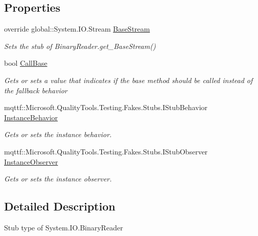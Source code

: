\subsection*{Properties}
\begin{DoxyCompactItemize}
\item 
override global\-::\-System.\-I\-O.\-Stream \hyperlink{class_system_1_1_i_o_1_1_fakes_1_1_stub_binary_reader_ab6f06d4c91093f83e053d80e821827ac}{Base\-Stream}
\begin{DoxyCompactList}\small\item\em Sets the stub of Binary\-Reader.\-get\-\_\-\-Base\-Stream()\end{DoxyCompactList}\item 
bool \hyperlink{class_system_1_1_i_o_1_1_fakes_1_1_stub_binary_reader_afd30a2af1eaea5ff8e2f0ec676f4f809}{Call\-Base}
\begin{DoxyCompactList}\small\item\em Gets or sets a value that indicates if the base method should be called instead of the fallback behavior\end{DoxyCompactList}\item 
mqttf\-::\-Microsoft.\-Quality\-Tools.\-Testing.\-Fakes.\-Stubs.\-I\-Stub\-Behavior \hyperlink{class_system_1_1_i_o_1_1_fakes_1_1_stub_binary_reader_a95cda755b17428a183801601449150ce}{Instance\-Behavior}
\begin{DoxyCompactList}\small\item\em Gets or sets the instance behavior.\end{DoxyCompactList}\item 
mqttf\-::\-Microsoft.\-Quality\-Tools.\-Testing.\-Fakes.\-Stubs.\-I\-Stub\-Observer \hyperlink{class_system_1_1_i_o_1_1_fakes_1_1_stub_binary_reader_af91fa35db818aee179996cbcf6fb128e}{Instance\-Observer}
\begin{DoxyCompactList}\small\item\em Gets or sets the instance observer.\end{DoxyCompactList}\end{DoxyCompactItemize}


\subsection{Detailed Description}
Stub type of System.\-I\-O.\-Binary\-Reader



